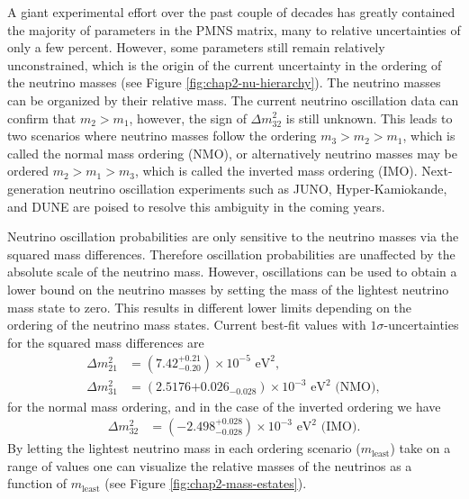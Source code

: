 A giant experimental effort over the past couple of decades has greatly contained the majority of parameters in the PMNS matrix, many to relative uncertainties of only a few percent. However, some parameters still remain relatively unconstrained, which is the origin of the current uncertainty in the ordering of the neutrino masses (see Figure \ref{fig:chap2-nu-hierarchy}). The neutrino masses can be organized by their relative mass. The current neutrino oscillation data can confirm that $m_2>m_1$, however, the sign of $\Delta m_{32}^2$ is still unknown. This leads to two scenarios where neutrino masses follow the ordering $m_3>m_2>m_1$, which is called the normal mass ordering (NMO), or alternatively neutrino masses may be ordered $m_2>m_1>m_3$, which is called the inverted mass ordering (IMO). Next-generation neutrino oscillation experiments such as JUNO, Hyper-Kamiokande, and DUNE are poised to resolve this ambiguity in the coming years.

Neutrino oscillation probabilities are only sensitive to the neutrino masses via the squared mass differences. Therefore oscillation probabilities are unaffected by the absolute scale of the neutrino mass. However, oscillations can be used to obtain a lower bound on the neutrino masses by setting the mass of the lightest neutrino mass state to zero. This results in different lower limits depending on the ordering of the neutrino mass states. Current best-fit values with $1\sigma$-uncertainties for the squared mass differences are 
\begin{align}
    \Delta m_{21}^2&=(7.42^{+0.21}_{-0.20})\times 10^{-5}\text{ eV}^2,\\
    \Delta m_{31}^2&=(2.5176{+0.026}_{-0.028})\times 10^{-3}\text{ eV}^2\text{ (NMO)},
\end{align}
for the normal mass ordering, and in the case of the inverted ordering we have
\begin{align}
    \Delta m_{32}^2&=(-2.498^{+0.028}_{-0.028})\times 10^{-3}\text{ eV}^2\text{ (IMO)}.
\end{align}
By letting the lightest neutrino mass in each ordering scenario ($m_\textrm{least}$) take on a range of values one can visualize the relative masses of the neutrinos as a function of $m_\textrm{least}$ (see Figure \ref{fig:chap2-mass-estates}).

